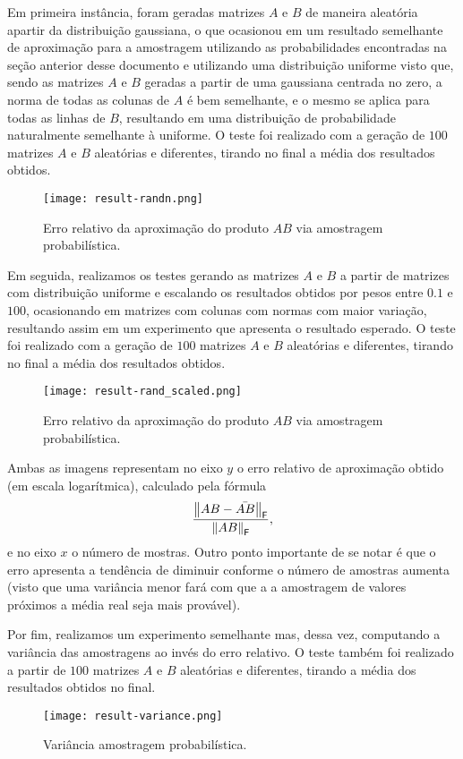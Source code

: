 
Em primeira instância, foram geradas matrizes $A$ e $B$ de maneira aleatória apartir da distribuição gaussiana, o que ocasionou em um resultado semelhante de aproximação para a amostragem utilizando as probabilidades encontradas na seção anterior desse documento e utilizando uma distribuição uniforme visto que, sendo as matrizes $A$ e $B$ geradas a partir de uma gaussiana centrada no zero, a norma de todas as colunas de $A$ é bem semelhante, e o mesmo se aplica para todas as linhas de $B$, resultando em uma distribuição de probabilidade naturalmente semelhante à uniforme. O teste foi realizado com a geração de $100$ matrizes $A$ e $B$ aleatórias e diferentes, tirando no final a média dos resultados obtidos.

\begin{figure}[H]
  \centering
  \texttt{[image: result-randn.png]}
  \caption{Erro relativo da aproximação do produto $AB$ via amostragem probabilística.}
\end{figure}

Em seguida, realizamos os testes gerando as matrizes $A$ e $B$ a partir de matrizes com distribuição uniforme e escalando os resultados obtidos por pesos entre $0.1$ e $100$, ocasionando em matrizes com colunas com normas com maior variação, resultando assim em um experimento que apresenta o resultado esperado. O teste foi realizado com a geração de $100$ matrizes $A$ e $B$ aleatórias e diferentes, tirando no final a média dos resultados obtidos.

\begin{figure}[H]
  \centering
  \texttt{[image: result-rand\_scaled.png]}
  \caption{Erro relativo da aproximação do produto $AB$ via amostragem probabilística.}
\end{figure}

Ambas as imagens representam no eixo $y$ o erro relativo de aproximação obtido (em escala logarítmica), calculado pela fórmula \[\dfrac{\left\lVert AB - \bar{AB}\right\rVert_\mathsf{F}}{\left\lVert AB\right\rVert_\mathsf{F}},\] e no eixo $x$ o número de mostras. Outro ponto importante de se notar é que o erro apresenta a tendência de diminuir conforme o número de amostras aumenta (visto que uma variância menor fará com que a a amostragem de valores próximos a média real seja mais provável).

Por fim, realizamos um experimento semelhante mas, dessa vez, computando a variância das amostragens ao invés do erro relativo. O teste também foi realizado a partir de $100$ matrizes $A$ e $B$ aleatórias e diferentes, tirando a média dos resultados obtidos no final.

\begin{figure}[H]
  \centering
  \texttt{[image: result-variance.png]}
  \caption{Variância amostragem probabilística.}
  \label{fig:second-experiment}
\end{figure}
